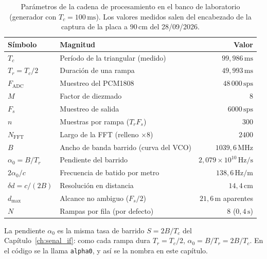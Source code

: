 \begin{table}[H]
  \centering
  \caption{Parámetros de la cadena de procesamiento en el banco de
  laboratorio (generador con $T_c = 100\,\text{ms}$). Los valores medidos
  salen del encabezado de la captura de la placa a $90\,\text{cm}$ del
  28/09/2026.}
  \label{tab:proc_parametros}
  \begin{tabular}{llr}
    \toprule
    \textbf{Símbolo} & \textbf{Magnitud} & \textbf{Valor} \\
    \midrule
    $T_c$        & Período de la triangular (medido)      & $99{,}986\,\text{ms}$ \\
    $T_r = T_c/2$ & Duración de una rampa                & $49{,}993\,\text{ms}$ \\
    $F_\text{ADC}$ & Muestreo del PCM1808                 & $48\,000\,\text{sps}$ \\
    $M$          & Factor de diezmado                      & $8$ \\
    $F_s$        & Muestreo de salida                      & $6000\,\text{sps}$ \\
    $n$          & Muestras por rampa ($T_r F_s$)          & $300$ \\
    $N_\text{FFT}$ & Largo de la FFT (relleno $\times 8$)  & $2400$ \\
    $B$          & Ancho de banda barrido (curva del VCO)  & $1039{,}6\,\text{MHz}$ \\
    $\alpha_0 = B/T_r$ & Pendiente del barrido             & $2{,}079\times10^{10}\,\text{Hz/s}$ \\
    $2\alpha_0/c$ & Frecuencia de batido por metro         & $138{,}6\,\text{Hz/m}$ \\
    $\delta d = c/(2B)$ & Resolución en distancia          & $14{,}4\,\text{cm}$ \\
    $d_\text{max}$ & Alcance no ambiguo ($F_s/2$)          & $21{,}6\,\text{m}$ aparentes \\
    $N$          & Rampas por fila (por defecto)           & $8$ ($0{,}4\,\text{s}$) \\
    \bottomrule
  \end{tabular}
\end{table}

La pendiente $\alpha_0$ es la misma tasa de barrido $S = 2B/T_c$ del
Capítulo~\ref{ch:senal_if}: como cada rampa dura $T_r = T_c/2$,
$\alpha_0 = B/T_r = 2B/T_c$. En el código se la llama \texttt{alpha0}, y
así se la nombra en este capítulo.


